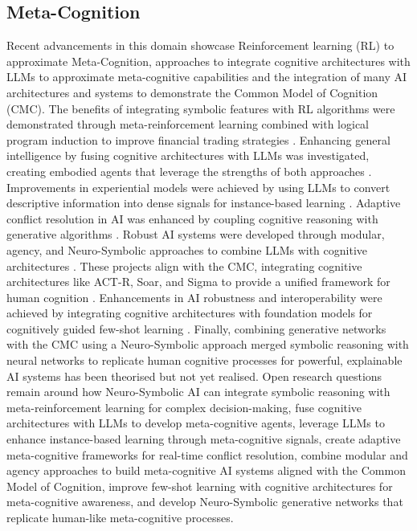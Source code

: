 \documentclass[hf]{ceurart}
\begin{document}
\subsection{Meta-Cognition}\label{subsec:disc_meta}
Recent advancements in this domain showcase Reinforcement learning (RL) to approximate Meta-Cognition, approaches to integrate cognitive architectures with LLMs to approximate meta-cognitive capabilities and the integration of many AI architectures and systems to demonstrate the Common Model of Cognition (CMC). The benefits of integrating symbolic features with RL algorithms were demonstrated through meta-reinforcement learning combined with logical program induction to improve financial trading strategies \cite{Harini2023}. Enhancing general intelligence by fusing cognitive architectures with LLMs was investigated, creating embodied agents that leverage the strengths of both approaches \cite{Joshi2024, Liu2024}. Improvements in experiential models were achieved by using LLMs to convert descriptive information into dense signals for instance-based learning \cite{McDonald2024}. Adaptive conflict resolution in AI was enhanced by coupling cognitive reasoning with generative algorithms \cite{Raja2024}. Robust AI systems were developed through modular, agency, and Neuro-Symbolic approaches to combine LLMs with cognitive architectures \cite{Romero2024, Sumers2023}. These projects align with the CMC, integrating cognitive architectures like ACT-R, Soar, and Sigma to provide a unified framework for human cognition \cite{Laird2017}. Enhancements in AI robustness and interoperability were achieved by integrating cognitive architectures with foundation models for cognitively guided few-shot learning \cite{Thomson2024}. Finally, combining generative networks with the CMC using a Neuro-Symbolic approach merged symbolic reasoning with neural networks to replicate human cognitive processes for powerful, explainable AI systems has been theorised but not yet realised\cite{West2024}. Open research questions remain around how Neuro-Symbolic AI can integrate symbolic reasoning with meta-reinforcement learning for complex decision-making, fuse cognitive architectures with LLMs to develop meta-cognitive agents, leverage LLMs to enhance instance-based learning through meta-cognitive signals, create adaptive meta-cognitive frameworks for real-time conflict resolution, combine modular and agency approaches to build meta-cognitive AI systems aligned with the Common Model of Cognition, improve few-shot learning with cognitive architectures for meta-cognitive awareness, and develop Neuro-Symbolic generative networks that replicate human-like meta-cognitive processes.
\end{document}
